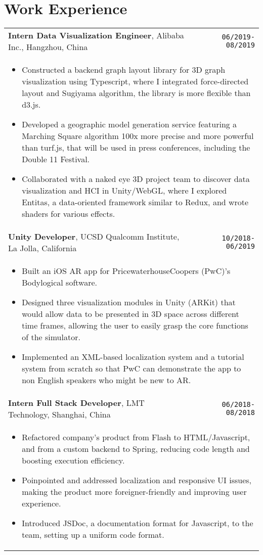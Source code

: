 \documentclass[10pt, letterpaper]{article}
\newcommand{\itemcols}[1]{
	\multicolumn{2}{p{\dimexpr \linewidth-2\tabcolsep}}{
	\begin{itemize}
		#1
	\end{itemize}
	}
}
\begin{document}
\section{Work Experience}
\smallskip
\noindent
\begin{tabularx}{\textwidth}{X r}
	\textbf{\large Intern Data Visualization Engineer}, Alibaba Inc., Hangzhou, China & \texttt{06/2019-08/2019} \\
	\itemcols{
		\item Constructed a backend graph layout library for 3D graph visualization using Typescript, where I integrated force-directed layout and Sugiyama algorithm, the library is more flexible than d3.js.
		\item Developed a geographic model generation service featuring a Marching Square algorithm 100x more precise and more powerful than turf.js, that will be used in press conferences, including the Double 11 Festival.
		\item Collaborated with a naked eye 3D project team to discover data visualization and HCI in Unity/WebGL, where I explored Entitas, a data-oriented framework similar to Redux, and wrote shaders for various effects.
	} \\

	\textbf{\large Unity Developer}, UCSD Qualcomm Institute, La Jolla, California & \texttt{10/2018-06/2019} \\
	\itemcols{		
		\item Built an iOS AR app for PricewaterhouseCoopers (PwC)'s Bodylogical software.
		\item Designed three visualization modules in Unity (ARKit) that would allow data to be presented in 3D space across different time frames, allowing the user to easily grasp the core functions of the simulator.
		\item Implemented an XML-based localization system and a tutorial system from scratch so that PwC can demonstrate the app to non English speakers who might be new to AR.
	} \\

	\textbf{\large Intern Full Stack Developer}, LMT Technology, Shanghai, China & \texttt{06/2018-08/2018} \\
	\itemcols{
		\item Refactored company's product from Flash to HTML/Javascript, and from a custom backend to Spring, reducing code length and boosting execution efficiency.
		\item Poinpointed and addressed localization and responsive UI issues, making the product more foreigner-friendly and improving user experience.
		\item Introduced JSDoc, a documentation format for Javascript, to the team, setting up a uniform code format.
	}
\end{tabularx}
\end{document}
